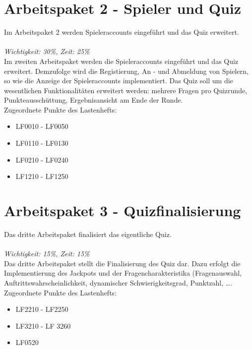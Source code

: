 \documentclass[11pt,a4paper]{scrreprt}
\begin{document}
\section{Arbeitspaket 2 - Spieler und Quiz}
Im Arbeitspaket 2 werden Spieleraccounts eingeführt und das Quiz erweitert. \\ \\
\textit{Wichtigkeit: 30\%, Zeit: 25\%} \\
Im zweiten Arbeitspaket werden die Spieleraccounts eingeführt und das Quiz erweitert. Demzufolge wird die Registierung, An - und Abmeldung von Spielern, so wie die Anzeige der Spieleraccounts implementiert. Das Quiz soll um die wesentlichen Funktionalitäten erweitert werden: mehrere Fragen pro Quizrunde, Punkteausschüttung, Ergebnisansicht am Ende der Runde.\\ 
Zugeordnete Punkte des Lastenhefts:
\begin{itemize}
\item LF0010 - LF0050
\item LF0110 - LF0130
\item LF0210 - LF0240
\item LF1210 - LF1250
\end{itemize}


\section{Arbeitspaket 3 - Quizfinalisierung}
Das dritte Arbeitspaket finalisiert das eigentliche Quiz. \\ \\
\textit{Wichtigkeit: 15\%, Zeit: 15\%} \\
Das dritte Arbeitspaket stellt die Finalisierung des Quiz dar. Dazu erfolgt die Implementierung des Jackpots  und der Fragencharakteristika (Fragenauswahl, Auftrittswahrscheinlichkeit, dynamischer Schwierigkeitsgrad, Punktzahl, \dots  .\\
Zugeordnete Punkte des Lastenhefts:
\begin{itemize}
\item LF2210 - LF2250
\item LF3210 - LF 3260
\item LF0520
\end{itemize}
\end{document}
